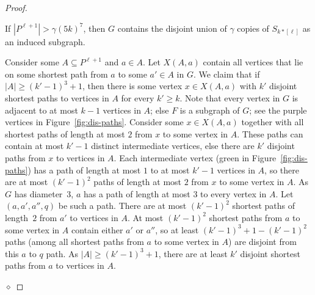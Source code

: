 \documentclass[runningheads,envcountsame]{llncs}
\newcommand{\forbiddenGraph}{F}
\newenvironment{claimproof}
{\noindent {\em Proof of Claim:} }
{\hfill $\diamond$ \smallskip}
\begin{document}
\begin{proof}
  
  \begin{mclaim}\label{clm:diam3claim1}
    If $|P^{\ell+1}| > \gamma(5k)^7$, then
    $G$ contains the disjoint union of $\gamma$ copies of
    $S_{k*[\ell]}$ as an induced subgraph.
  \end{mclaim}
  \begin{claimproof}
    Consider some $A \subseteq P^{\ell+1}$ and
    $a \in A$. Let $X(A,a)$ contain all vertices that lie on some shortest
    path from $a$ to some $a' \in A$ in $G$.
    We claim that if $\vert A \vert \geq (k'-1)^3+1$,
    then there is some vertex $x \in X(A,a)$ with $k'$ disjoint
    shortest paths to vertices in $A$ for every $k' \geq k$. Note that every vertex in $G$ is adjacent to at
    most $k-1$ vertices in $A$; else
    $\forbiddenGraph$ is a subgraph of $G$; see the purple vertices in Figure~\ref{fig:dis-paths}.  Consider some $x
    \in X(A,a)$ together with all shortest paths of length at most $2$ from $x$
    to some vertex in $A$. 
    These paths can contain at most $k'-1$
    distinct intermediate vertices, else there are $k'$ disjoint
    paths from $x$ to vertices in $A$. Each intermediate vertex (green in Figure~\ref{fig:dis-paths}) has a path of length at
    most $1$ to at most $k'-1$ vertices in $A$, so there are at most
    $(k'-1)^2$ paths of length at most $2$ from $x$ to some vertex in
    $A$. As $G$ has diameter~$3$, $a$ has a path of length at most
    $3$ to every vertex in $A$. Let
    $(a,a',a'',q)$ be such a path. There are at most $(k'-1)^2$ shortest paths of
    length~$2$ from $a'$ to vertices in $A$. At most $(k'-1)^2$
    shortest paths from $a$ to some vertex in $A$ contain either $a'$
    or $a''$, so at least $(k'-1)^3+1 -(k'-1)^2$ paths (among all
    shortest paths from $a$ to some vertex in $A$) are disjoint
    from this $a$ to $q$ path. As $\vert A \vert \geq (k'-1)^3+1$,
    there are at least $k'$ disjoint shortest paths from $a$ to vertices in
    $A$.


\end{claimproof}
\end{proof}
\end{document}
